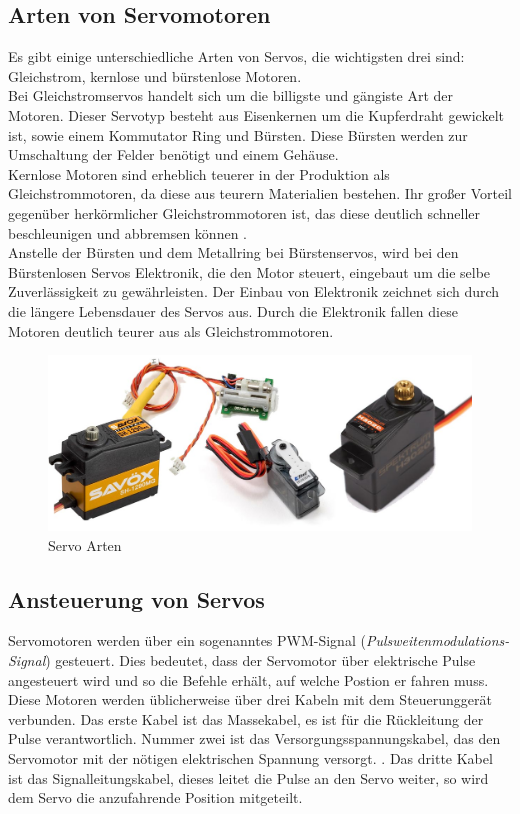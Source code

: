 \subsection{Arten von Servomotoren}
Es gibt einige unterschiedliche Arten von Servos, die wichtigsten drei sind: Gleichstrom, kernlose und bürstenlose Motoren. \\
Bei Gleichstromservos handelt sich um die billigste und gängiste Art der Motoren. Dieser Servotyp besteht aus Eisenkernen um die Kupferdraht gewickelt ist, sowie einem Kommutator Ring und Bürsten. Diese Bürsten werden zur Umschaltung der Felder benötigt und einem Gehäuse. \\
Kernlose Motoren sind erheblich teuerer in der Produktion als Gleichstrommotoren, da diese aus teurern Materialien bestehen. Ihr großer Vorteil gegenüber herkörmlicher Gleichstrommotoren ist, das diese deutlich schneller beschleunigen und abbremsen können \parencite{ServomotorArten}. \\
Anstelle der Bürsten und dem Metallring bei Bürstenservos, wird bei den Bürstenlosen Servos Elektronik, die den Motor steuert, eingebaut um die selbe Zuverlässigkeit zu gewährleisten. Der Einbau von Elektronik zeichnet sich durch die längere Lebensdauer des Servos aus. Durch die Elektronik fallen diese Motoren deutlich teurer aus als Gleichstrommotoren. \\

\begin{figure}[H]
	\centering
	\includegraphics[width=0.5\linewidth]{images/ServoArten.jpg}
	\caption[Servo Arten]{Servo Arten}
	\label{fig:Servo Arten}
\end{figure}



\subsection{Ansteuerung von Servos}
Servomotoren werden über ein sogenanntes PWM-Signal (\textit{Pulsweitenmodulations-Signal}) gesteuert. Dies bedeutet, dass der Servomotor über elektrische Pulse angesteuert wird und so die Befehle erhält, auf welche Postion er fahren muss. Diese Motoren werden üblicherweise über drei Kabeln mit dem Steuerunggerät verbunden. Das erste Kabel ist das Massekabel, es ist für die Rückleitung der Pulse verantwortlich. Nummer zwei ist das Versorgungsspannungskabel, das den Servomotor mit der nötigen elektrischen Spannung versorgt. \parencite{ServomotorAnsteuerung}. Das dritte Kabel ist das Signalleitungskabel, dieses  leitet die Pulse an den Servo weiter, so wird dem Servo die anzufahrende Position mitgeteilt.\\


